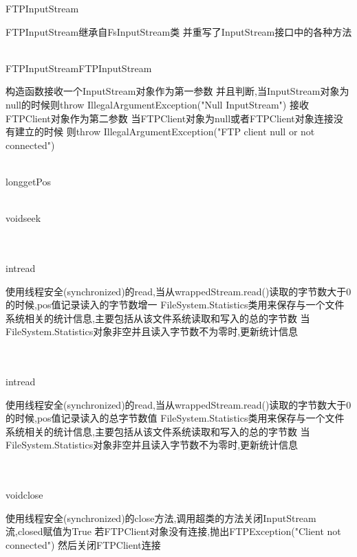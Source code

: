 \begin{XeClass}{FTPInputStream}
   
 FTPInputStream继承自FsInputStream类
 并重写了InputStream接口中的各种方法

  \begin{XeMethod}{\XePublic\\ }{FTPInputStream}{FTPInputStream}
       
 构造函数接收一个InputStream对象作为第一参数
 并且判断,当InputStream对象为null的时候则throw IllegalArgumentException("Null InputStream")
 接收FTPClient对象作为第二参数
 当FTPClient对象为null或者FTPClient对象连接没有建立的时候
 则throw IllegalArgumentException("FTP client null or not connected")

  \end{XeMethod}

  \begin{XeMethod}{\XePublic\\ }{long}{getPos}
       

  \end{XeMethod}

  \begin{XeMethod}{\XePublic\\ }{void}{seek}
       

  \end{XeMethod}

  \begin{XeMethod}{\XePublic\\ \XeSync\\ }{int}{read}
       
 使用线程安全(synchronized)的read,当从wrappedStream.read()读取的字节数大于0的时候,pos值记录读入的字节数增一
 FileSystem.Statistics类用来保存与一个文件系统相关的统计信息,主要包括从该文件系统读取和写入的总的字节数
 当FileSystem.Statistics对象非空并且读入字节数不为零时,更新统计信息

  \end{XeMethod}

  \begin{XeMethod}{\XePublic\\ \XeSync\\ }{int}{read}
       
 使用线程安全(synchronized)的read,当从wrappedStream.read()读取的字节数大于0的时候,pos值记录读入的总字节数值
 FileSystem.Statistics类用来保存与一个文件系统相关的统计信息,主要包括从该文件系统读取和写入的总的字节数
 当FileSystem.Statistics对象非空并且读入字节数不为零时,更新统计信息

  \end{XeMethod}

  \begin{XeMethod}{\XePublic\\ \XeSync\\ }{void}{close}
       
 使用线程安全(synchronized)的close方法,调用超类的方法关闭InputStream流,closed赋值为True
 若FTPClient对象没有连接,抛出FTPException("Client not connected")
 然后关闭FTPClient连接

  \end{XeMethod}

\end{XeClass}
